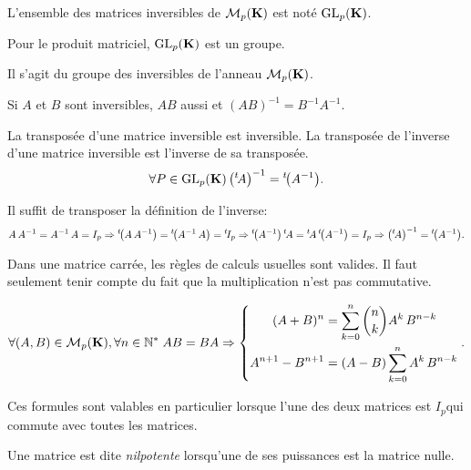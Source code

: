 \begin{defi}
L'ensemble des matrices inversibles de $\mathcal{M}_p(\mathbf{K})$ est noté $\text{GL}_p(\mathbf{K})$. 
\end{defi}

\begin{prop}
  Pour le produit matriciel, $\text{GL}_p(\mathbf{K})$ est un groupe.
\end{prop}
\begin{demo}
  Il s'agit du groupe des inversibles de l'anneau $\mathcal{M}_p(\mathbf{K})$.
\end{demo}
\begin{rem}
  Si $A$ et $B$ sont inversibles, $AB$ aussi et $(AB)^{-1} = B^{-1}A^{-1}$.
\end{rem}
\begin{prop}
 La transposée d'une matrice inversible est inversible. La transposée de l'inverse d'une matrice inversible est l'inverse de sa transposée.
\[
 \forall P \in \text{GL}_p(\mathbf{K}) \left( \mathstrut^t\!{A}\right)^{-1} = \mathstrut^t\!{\left( A^{-1}\right) }. 
\]
\end{prop}
\begin{demo}
 Il suffit de transposer la définition de l'inverse:
\[
 A\, A^{-1} = A^{-1}\, A = I_p 
 \Rightarrow \trans{\left( A\, A^{-1}\right)}  = \trans{\left( A^{-1}\, A\right) } = \trans{I_p}
 \Rightarrow \trans{\left( A^{-1}\right)}\,\trans{A} = \trans{A}\,\trans{\left( A^{-1}\right)} = I_p
 \Rightarrow \left( \trans{A} \right)^{-1} =  \trans{\left( A^{-1}\right)}.
\]
\end{demo}
Dans une matrice carrée, les règles de calculs usuelles sont valides. Il faut seulement tenir compte du fait que la multiplication n'est pas commutative.
\begin{prop}
\[
 \forall (A,B) \in \mathcal{M}_{p}(\mathbf{K}), \forall n \in \mathbb{N}^*\;
 A B = B A \Rightarrow
 \left\lbrace 
 \begin{aligned}
  (A + B)^n &= \sum_{k=0}^n \binom{n}{k}A^k\, B^{n-k} \\
  A^{n+1} - B^{n+1} &= (A - B)\sum_{k=0}^n A^k\,B^{n-k} 
 \end{aligned}
\right. .
\]
\end{prop}
\begin{rem}
 Ces formules sont valables en particulier lorsque l'une des deux matrices est $I_p$qui commute avec toutes les matrices.
\end{rem}
\begin{defi}
 Une matrice est dite \emph{nilpotente}  lorsqu'une de ses puissances est la matrice nulle.
\end{defi}

